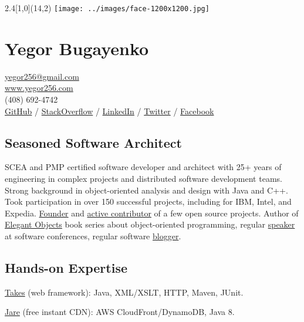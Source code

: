 \documentclass[12pt]{article}
\begin{document}
\setlength{\topskip}{0mm}
\setlength{\parindent}{0pt}
\setlength{\parskip}{4pt}
\raggedright
{}

\begin{textblock}{2.4}[1,0](14,2){
  \texttt{[image: ../images/face-1200x1200.jpg]}
}\end{textblock}

\section*{Yegor Bugayenko}

\href{mailto:yegor256@gmail.com}{yegor256@gmail.com}\\%
\href{https://www.yegor256.com}{www.yegor256.com}\\%
(408) 692-4742\\%
\href{https://github.com/yegor256}{GitHub} /
\href{https://stackexchange.com/users/63162/yegor256}{StackOverflow} /
\href{https://www.linkedin.com/in/yegor256}{LinkedIn} /
\href{https://twitter.com/intent/follow?screen_name=yegor256}{Twitter} /
\href{https://www.facebook.com/yegor256}{Facebook}

\subsection*{Seasoned Software Architect}

SCEA and PMP certified software developer and architect with
25+ years of engineering in complex projects and distributed software
development teams. Strong background in object-oriented analysis and design
with Java and C++. Took participation in over 150 successful projects,
including for IBM, Intel, and Expedia. \href{https://www.yegor256.com/pets.html}{Founder}
and \href{https://github.com/yegor256}{active contributor} of
a few open source projects. Author of
\href{https://www.yegor256.com/elegant-objects.html}{Elegant Objects}
book series about object-oriented programming,
regular \href{https://www.yegor256.com/talks.html}{speaker} at software conferences, regular software
\href{https://www.yegor256.com}{blogger}.

\subsection*{Hands-on Expertise}

\href{http://www.takes.org}{Takes} (web framework):
Java, XML/XSLT, HTTP, Maven, JUnit.

\href{http://www.jare.io}{Jare} (free instant CDN):
AWS CloudFront/DynamoDB, Java 8.
\end{document}
